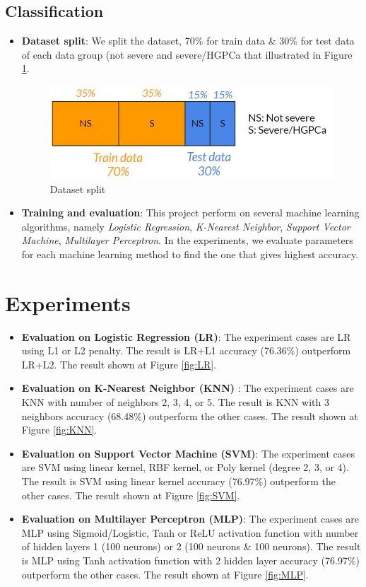 \documentclass[a4paper,oneside]{article}
\begin{document}
\subsection{Classification}
\begin{itemize}
\item \textbf{Dataset split}: We split the dataset, 70\% for train data \& 30\% for test data of each data group (not severe and severe/HGPCa that illustrated in Figure \ref{fig:data_split}.
\begin{figure}
  \includegraphics[width=0.4\linewidth]{data_split}
  \centering
  \caption{Dataset split}
  \label{fig:data_split}
\end{figure}
\item \textbf{Training and evaluation}: This project perform on several machine learning algorithms, namely \textit{Logistic Regression}, \textit{K-Nearest Neighbor}, \textit{Support Vector Machine}, \textit{Multilayer Perceptron}. In the experiments, we evaluate parameters for each machine learning method to find the one that gives highest accuracy.
\end{itemize}

\section{Experiments}
\begin{itemize}
\item \textbf{Evaluation on Logistic Regression (LR)}: The experiment cases are LR using L1 or L2 penalty. The result is LR+L1 accuracy (76.36\%) outperform LR+L2. The result shown at Figure \ref{fig:LR}.

\item \textbf{Evaluation on K-Nearest Neighbor (KNN)} : The experiment cases are KNN with number of neighbors 2, 3, 4, or 5. The result is KNN with 3 neighbors accuracy (68.48\%) outperform the other cases. The result shown at Figure \ref{fig:KNN}.

\item \textbf{Evaluation on Support Vector Machine (SVM)}: The experiment cases are SVM using linear kernel, RBF kernel, or Poly kernel (degree 2, 3, or 4). The result is SVM using linear kernel accuracy (76.97\%) outperform the other cases. The result shown at Figure \ref{fig:SVM}.

\item \textbf{Evaluation on Multilayer Perceptron (MLP)}: The experiment cases are MLP using Sigmoid/Logistic, Tanh or ReLU activation function with number of hidden layers 1 (100 neurons) or 2 (100 neurons \& 100 neurons). The result is MLP using Tanh activation function with 2 hidden layer accuracy (76.97\%) outperform the other cases. The result shown at Figure \ref{fig:MLP}.

\end{itemize}
\end{document}
